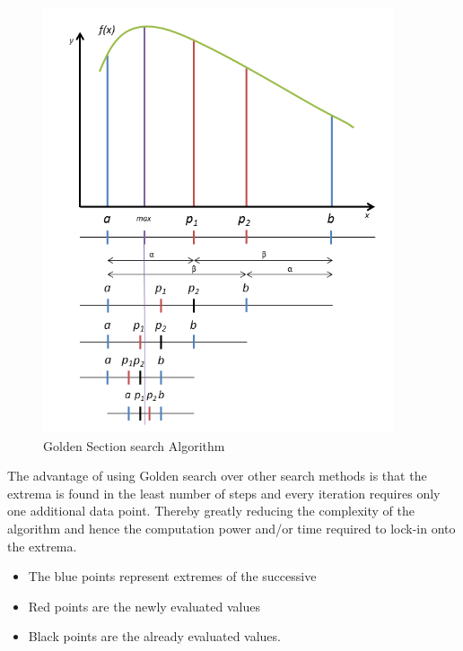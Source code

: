 { 
\begin{figure}[H]
  \begin{center}
  \includegraphics[width=0.92\textwidth]{images/Golden_search_curve}
  \caption{ Golden Section search Algorithm }
  \label{fig:Golden_search_curve}
  \end{center}
  \end{figure}
  
The advantage of using Golden search over other search methods is that the extrema is found in the least number of steps and every iteration requires only one additional data point. Thereby greatly reducing the complexity of the algorithm and hence the computation power and/or time required to lock-in onto the extrema.
\begin{itemize}
	 \item The blue points represent extremes of the successive
	 \item Red points  are the newly evaluated values
	 \item Black points are the already evaluated values.
 \end{itemize}


}
